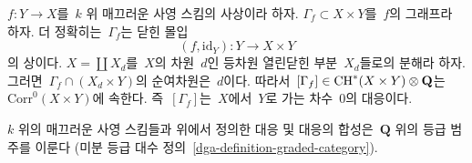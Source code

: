 \begin{example}
\label{example-graph-correspondence}
$f : Y \to X$를\  $k$ 위 매끄러운 사영 스킴의 사상이라 하자.
$\Gamma_f \subset X \times Y$를\  $f$의 그래프라 하자. 더 정확히는\ 
$\Gamma_f$는 닫힌 몰입
$$
(f, \text{id}_Y) : Y \longrightarrow X \times Y
$$
의 상이다. $X = \coprod X_d$를\  $X$의 차원\  $d$인 등차원 열린닫힌 부분\ 
$X_d$들로의 분해라 하자. 그러면\ 
$\Gamma_f \cap (X_d \times Y)$의 순여차원은\  $d$이다. 따라서\ 
$[\Gamma_f] \in \mathop{\mathrm{CH}}\nolimits^*(X \times Y) \otimes \mathbf{Q}$는\ 
$\text{Corr}^0(X \times Y)$에 속한다. 즉\  $[\Gamma_f]$는\ 
$X$에서\  $Y$로 가는 차수\  $0$의 대응이다.
\end{example}

\begin{lemma}
\label{lemma-category-correspondences}
$k$ 위의 매끄러운 사영 스킴들과 위에서 정의한 대응 및 대응의 합성은\ 
$\mathbf{Q}$ 위의 등급 범주를 이룬다
(미분 등급 대수 정의\  \ref{dga-definition-graded-category}).
\end{lemma}

